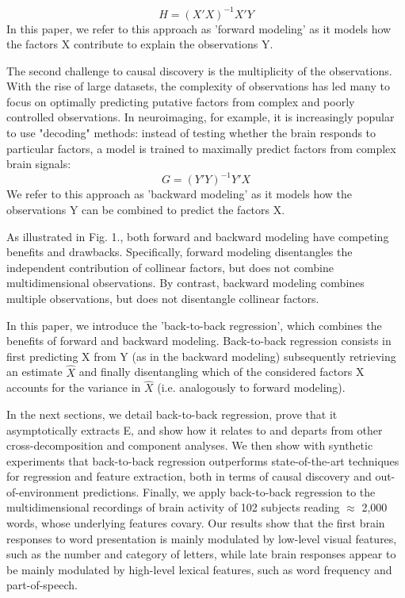\documentclass{article}
\begin{document}
\begin{equation}
H = (X'X)^{-1} X'Y
\end{equation}
In this paper, we refer to this approach as 'forward modeling' as it models how the factors X contribute to explain the observations Y. \par
%
%
The second challenge to causal discovery is the multiplicity of the observations.
With the rise of large datasets, the complexity of observations has led many to focus on optimally predicting putative factors from complex and poorly controlled observations. In neuroimaging, for example, it is increasingly popular to use "decoding" methods: instead of testing whether the brain responds to particular factors, a model is trained to maximally predict factors from complex brain signals:
\begin{equation}
G = (Y'Y)^{-1} Y'X
\end{equation}
We refer to this approach as 'backward modeling' as it models how the observations Y can be combined to predict the factors X. \par
%
%
As illustrated in Fig. 1., both forward and backward modeling have competing benefits and drawbacks. Specifically, forward modeling disentangles the independent contribution of collinear factors, but does not combine multidimensional observations. By contrast, backward modeling combines multiple observations, but does not disentangle collinear factors. \par
%
%
In this paper, we introduce the 'back-to-back regression', which combines the benefits of forward and backward modeling. Back-to-back regression consists in first predicting X from Y (as in the backward modeling) subsequently retrieving an estimate $\hat X$ and finally disentangling which of the considered factors X accounts for the variance in $\hat X$ (i.e. analogously to forward modeling). \par
%
In the next sections, we detail back-to-back regression, prove that it asymptotically extracts E, and show how it relates to and departs from other cross-decomposition and component analyses. We then show with synthetic experiments that back-to-back regression outperforms state-of-the-art techniques for regression and feature extraction, both in terms of causal discovery and out-of-environment predictions. Finally, we apply back-to-back regression to the multidimensional recordings of brain activity of 102 subjects reading $\approx$ 2,000 words, whose underlying features covary. Our results  show that the first brain responses to word presentation is mainly modulated by low-level visual features, such as the number and category of letters, while late brain responses appear to be mainly modulated by high-level lexical features, such as word frequency and part-of-speech. \par
%
\end{document}
